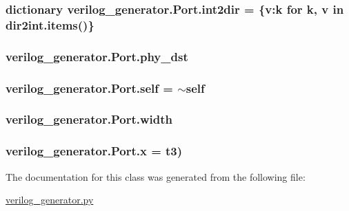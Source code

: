 \hypertarget{classverilog__generator_1_1Port_a32e2aa34b25401e3b4cdfe996d236d9b}{
\subsubsection[{int2dir}]{\setlength{\rightskip}{0pt plus 5cm}dictionary verilog\-\_\-generator.\-Port.\-int2dir = \{v\-:k for k, v in dir2int.\-items()\}\hspace{0.3cm}{\ttfamily [static]}}}\label{classverilog__generator_1_1Port_a32e2aa34b25401e3b4cdfe996d236d9b}
\hypertarget{classverilog__generator_1_1Port_a628bc4ff9e6134c811e34bc9cd0b079c}{
\subsubsection[{phy\-\_\-dst}]{\setlength{\rightskip}{0pt plus 5cm}verilog\-\_\-generator.\-Port.\-phy\-\_\-dst}}\label{classverilog__generator_1_1Port_a628bc4ff9e6134c811e34bc9cd0b079c}
\hypertarget{classverilog__generator_1_1Port_a9f897dd8b1f10342ea181e7cf3d80af3}{
\subsubsection[{self}]{\setlength{\rightskip}{0pt plus 5cm}verilog\-\_\-generator.\-Port.\-self = $\sim$self\hspace{0.3cm}{\ttfamily [static]}}}\label{classverilog__generator_1_1Port_a9f897dd8b1f10342ea181e7cf3d80af3}
\hypertarget{classverilog__generator_1_1Port_a3f3622f36b1f3f9ee2318e94b79a55bb}{
\subsubsection[{width}]{\setlength{\rightskip}{0pt plus 5cm}verilog\-\_\-generator.\-Port.\-width}}\label{classverilog__generator_1_1Port_a3f3622f36b1f3f9ee2318e94b79a55bb}
\hypertarget{classverilog__generator_1_1Port_aa1ecb52cdeafd852c6e6fb75c9c1b5b4}{
\subsubsection[{x}]{\setlength{\rightskip}{0pt plus 5cm}verilog\-\_\-generator.\-Port.\-x = t3)\hspace{0.3cm}{\ttfamily [static]}}}\label{classverilog__generator_1_1Port_aa1ecb52cdeafd852c6e6fb75c9c1b5b4}


The documentation for this class was generated from the following file\-:\begin{DoxyCompactItemize}
\item 
\hyperlink{verilog__generator_8py}{verilog\-\_\-generator.\-py}\end{DoxyCompactItemize}
